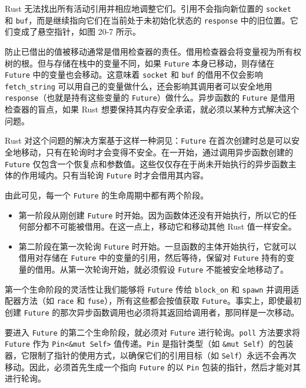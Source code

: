 Rust 无法找出所有活动引用并相应地调整它们。引用不会指向新位置的 \texttt{socket} 和 \texttt{buf}，而是继续指向它们在当前处于未初始化状态的 \texttt{response} 中的旧位置。它们变成了悬空指针，如图 20-7 所示。


防止已借出的值被移动通常是借用检查器的责任。借用检查器会将变量视为所有权树的根。但与存储在栈中的变量不同，如果 \texttt{Future} 本身已移动，则存储在 \texttt{Future} 中的变量也会移动。这意味着 \texttt{socket} 和 \texttt{buf} 的借用不仅会影响 \texttt{fetch\_string} 可以用自己的变量做什么，还会影响其调用者可以安全地用 \texttt{response}（也就是持有这些变量的 \texttt{Future}）做什么。异步函数的 \texttt{Future} 是借用检查器的盲点，如果 Rust 想要保持其内存安全承诺，就必须以某种方式解决这个问题。

Rust 对这个问题的解决方案基于这样一种洞见：\texttt{Future} 在首次创建时总是可以安全地移动，只有在轮询时才会变得不安全。在一开始，通过调用异步函数创建的 \texttt{Future} 仅包含一个恢复点和参数值。这些仅仅存在于尚未开始执行的异步函数主体的作用域内。只有当轮询 \texttt{Future} 时才会借用其内容。

由此可见，每一个 \texttt{Future} 的生命周期中都有两个阶段。

\begin{itemize}
\item 第一阶段从刚创建 \texttt{Future} 时开始。因为函数体还没有开始执行，所以它的任何部分都不可能被借用。在这一点上，移动它和移动其他 Rust 值一样安全。
\item 第二阶段在第一次轮询 \texttt{Future} 时开始。一旦函数的主体开始执行，它就可以借用对存储在 \texttt{Future} 中的变量的引用，然后等待，保留对 \texttt{Future} 持有的变量的借用。从第一次轮询开始，就必须假设 \texttt{Future} 不能被安全地移动了。
\end{itemize}

第一个生命阶段的灵活性让我们能够将 \texttt{Future} 传给 \texttt{block\_on} 和 \texttt{spawn} 并调用适配器方法（如 \texttt{race} 和 \texttt{fuse}），所有这些都会按值获取 \texttt{Future}。事实上，即使最初创建 \texttt{Future} 的那次异步函数调用也必须将其返回给调用者，那同样是一次移动。

要进入 \texttt{Future} 的第二个生命阶段，就必须对 \texttt{Future} 进行轮询。\texttt{poll} 方法要求将 \texttt{Future} 作为 \texttt{Pin<\&mut Self>} 值传递。\texttt{Pin} 是指针类型（如 \texttt{\&mut Self}）的包装器，它限制了指针的使用方式，以确保它们的引用目标（如 \texttt{Self}）永远不会再次移动。因此，必须首先生成一个指向 \texttt{Future} 的以 \texttt{Pin} 包装的指针，然后才能对其进行轮询。

